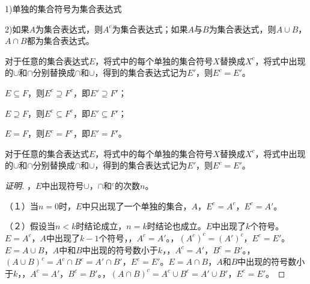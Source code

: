 \documentclass{beamer}
\begin{document}
\begin{CJK*}{UTF8}{gbsn}
\begin{frame}
\begin{Def1}
    1)单独的集合符号为集合表达式

    2)如果$A$为集合表达式，则$A^c$为集合表达式；如果$A$与$B$为集合表达式，则$A\cup B$，$A\cap B$都为集合表达式。
  \end{Def1}
\end{frame}
\begin{frame}
  \begin{Thm4}
    对于任意的集合表达式$E$，将式中的每个单独的集合符号$X$替换成$X^c$，将式中出现的$\cup$和$\cap$分别替换成$\cap$和$\cup$，得到的集合表达式记为$E'$，则$E^c=E'$。
  \end{Thm4}

  $E\subseteq F$，则$E^c\supseteq F^c$，即$E'\supseteq F'$；

  $E\supseteq F$，则$E^c\subseteq F^c$，即$E'\subseteq F'$；

  $E=F$，则$E^c=F^c$，即$E'=F'$。
\end{frame}

\begin{frame}
  \begin{Thm4}
    对于任意的集合表达式$E$，将式中的每个单独的集合符号$X$替换成$X^c$，将式中出现的$\cup$和$\cap$分别替换成$\cap$和$\cup$，得到的集合表达式记为$E'$，则$E^c=E'$。
  \end{Thm4}
  \pause\begin{proof}[证明]\justifying\let\raggedright\justifying
    ，$E$中出现符号$\cup$，$\cap$和$^c$的次数$n$。

    \pause（１）当$n=0$时，\pause$E$中只出现了一个单独的集合，$A$，$E^c=A^c$，$E^c=A'$。

    \pause（２）假设当$n<k$时结论成立，$n=k$时结论也成立。$E$中出现了$k$个符号。$E=A^c$，$A$中出现了$k-1$个符号，，\pause $A^c=A'$。，\pause$(A^c)^c=(A')^c$，$E^c=E'$。$E=A\cup B$，$A$中和$B$中出现的符号数小于$k$，，\pause$A^c=A'$，\pause$B^c=B'$。，\pause$(A\cup B)^c=A^c\cap B^c=A'\cap B'$，$E^c=E'$。$E=A\cap B$，$A$和$B$中出现的符号数小于$k$，，\pause$A^c=A'$，\pause$B^c=B'$。，\pause$(A\cap B)^c=A^c\cup B^c=A'\cup B'$，$E^c=E'$。
  \end{proof}
\end{frame}

\end{CJK*}
\end{document}
